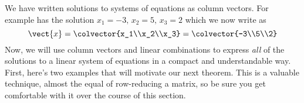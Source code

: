 %
%
%
We have written solutions to systems of equations as column vectors.  For example  has the solution  $x_1 = -3,\,x_2 = 5,\,x_3 = 2$ which we now write as
%
\begin{equation*}
\vect{x}=\colvector{x_1\\x_2\\x_3}=\colvector{-3\\5\\2}
\end{equation*}
%
Now, we will use column vectors and linear combinations to express {\em all} of the solutions to a linear system of equations in a compact and understandable way.  First, here's two examples that will motivate our next theorem.  This is a valuable technique, almost the equal of row-reducing a matrix, so be sure you get comfortable with it over the course of this section.
%
